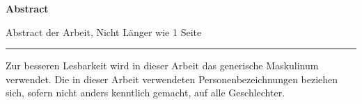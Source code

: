 \newpage
\begin{center}
    \textbf{Abstract}
\end{center}
Abstract der Arbeit, Nicht Länger wie 1 Seite

\vfill
\hrule
\vspace{0.5\baselineskip}
\noindent
Zur besseren Lesbarkeit wird in dieser Arbeit das generische Maskulinum verwendet. Die in dieser Arbeit verwendeten Personenbezeichnungen beziehen sich, sofern nicht anders kenntlich gemacht, auf alle Geschlechter.
\newpage
